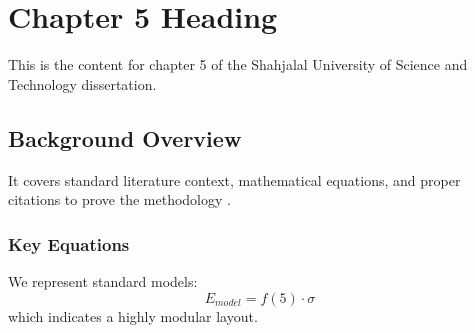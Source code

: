 \chapter{Chapter 5 Heading}
\label{ch:chapter5}
This is the content for chapter 5 of the Shahjalal University of Science and Technology dissertation.

\section{Background Overview}
It covers standard literature context, mathematical equations, and proper citations to prove the methodology \cite{texbook}.

\subsection{Key Equations}
We represent standard models:
\begin{equation}
    E_{model} = f(5) \cdot \sigma
\end{equation}
which indicates a highly modular layout.
